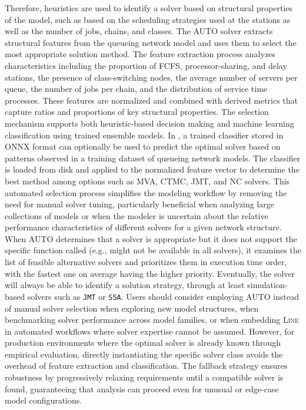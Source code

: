 Therefore, heuristics are used to identify a solver based on structural properties of the model, such as based on the scheduling strategies used at the stations as well as the number of jobs, chains, and classes. The AUTO solver extracts structural features from the queueing network model and uses them to select the most appropriate solution method. The feature extraction process analyzes characteristics including the proportion of FCFS, processor-sharing, and delay stations, the presence of class-switching nodes, the average number of servers per queue, the number of jobs per chain, and the distribution of service time processes. These features are normalized and combined with derived metrics that capture ratios and proportions of key structural properties. The selection mechanism supports both heuristic-based decision making and machine learning classification using trained ensemble models. In \Matlab{}, a trained classifier stored in ONNX format can optionally be used to predict the optimal solver based on patterns observed in a training dataset of queueing network models. The classifier is loaded from disk and applied to the normalized feature vector to determine the best method among options such as MVA, CTMC, JMT, and NC solvers. This automated selection process simplifies the modeling workflow by removing the need for manual solver tuning, particularly beneficial when analyzing large collections of models or when the modeler is uncertain about the relative performance characteristics of different solvers for a given network structure. When AUTO determines that a solver is appropriate but it does not support the specific function called (e.g.,  might not be available in all solvers), it examines the list of feasible alternative solvers and prioritizes them in execution time order, with the fastest one on average having the higher priority. Eventually, the solver will always be able to identify a solution strategy, through at least simulation-based solvers such as \texttt{JMT} or \texttt{SSA}. Users should consider employing AUTO instead of manual solver selection when exploring new model structures, when benchmarking solver performance across model families, or when embedding \textsc{Line} in automated workflows where solver expertise cannot be assumed. However, for production environments where the optimal solver is already known through empirical evaluation, directly instantiating the specific solver class avoids the overhead of feature extraction and classification. The fallback strategy ensures robustness by progressively relaxing requirements until a compatible solver is found, guaranteeing that analysis can proceed even for unusual or edge-case model configurations.

